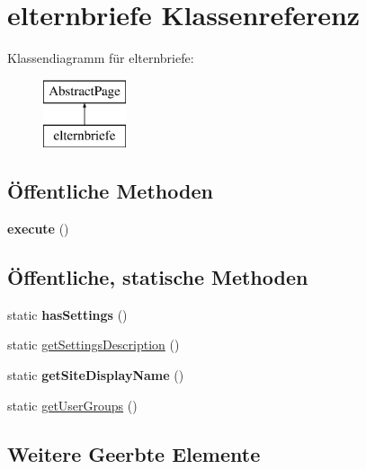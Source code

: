 \hypertarget{classelternbriefe}{}\section{elternbriefe Klassenreferenz}
\label{classelternbriefe}
Klassendiagramm für elternbriefe\+:\begin{figure}[H]
\begin{center}
\leavevmode
\includegraphics[height=2.000000cm]{classelternbriefe}
\end{center}
\end{figure}
\subsection*{Öffentliche Methoden}
\begin{DoxyCompactItemize}
\item 
\mbox{\label{classelternbriefe_ac33fd96f813291956ce8a3742f40ad06}} 
{\bfseries execute} ()
\end{DoxyCompactItemize}
\subsection*{Öffentliche, statische Methoden}
\begin{DoxyCompactItemize}
\item 
\mbox{\label{classelternbriefe_ae5cd15efc47f3cb1de41907b6a69409c}} 
static {\bfseries has\+Settings} ()
\item 
static \mbox{\hyperlink{classelternbriefe_a13d7c07f33fa27d7a368173cfe888418}{get\+Settings\+Description}} ()
\item 
\mbox{\label{classelternbriefe_a1e9a0c7a634e009e7e42dcc0b6243d9b}} 
static {\bfseries get\+Site\+Display\+Name} ()
\item 
static \mbox{\hyperlink{classelternbriefe_a24714ea5e6fd9c082d62f003e13b5e4d}{get\+User\+Groups}} ()
\end{DoxyCompactItemize}
\subsection*{Weitere Geerbte Elemente}



